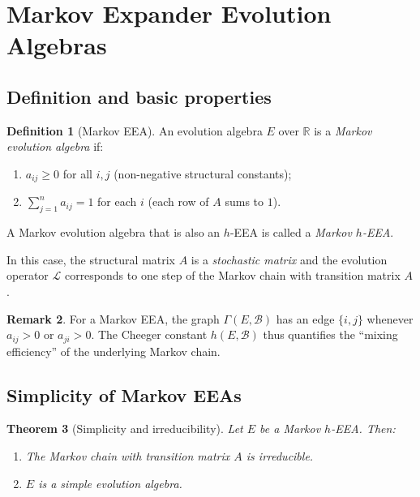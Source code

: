 \documentclass[12pt,a4paper]{amsart}
\newtheorem{theorem}{Theorem}[section]
\theoremstyle{definition}
\newtheorem{definition}[theorem]{Definition}
\newtheorem{remark}[theorem]{Remark}
\newcommand{\R}{\mathbb{R}}
\newcommand{\hh}{h}          %
\newcommand{\EA}{E}          %
\newcommand{\natbasis}{\mathcal{B}}  %
\newcommand{\strmat}{A}      %
\newcommand{\evop}{\mathcal{L}} %
\begin{document}
\section{Markov Expander Evolution Algebras}\label{sec:markov}

\subsection{Definition and basic properties}

\begin{definition}[Markov EEA]\label{def:markov-EEA}
An evolution algebra $\EA$ over $\R$ is a \emph{Markov evolution
algebra} if:
\begin{enumerate}[label=\normalfont(\roman*)]
  \item $a_{ij}\ge 0$ for all $i,j$ (non-negative structural constants);
  \item $\sum_{j=1}^n a_{ij}=1$ for each $i$ (each row of $\strmat$ sums
        to $1$).
\end{enumerate}
A Markov evolution algebra that is also an $h$-EEA is called a
\emph{Markov $h$-EEA}.
\end{definition}

In this case, the structural matrix $\strmat$ is a \emph{stochastic
matrix} and the evolution operator $\evop$ corresponds to one step of
the Markov chain with transition matrix $\strmat$.

\begin{remark}
For a Markov EEA, the graph $\varGamma(\EA,\natbasis)$ has an edge
$\{i,j\}$ whenever $a_{ij}>0$ or $a_{ji}>0$.  The Cheeger constant
$\hh(\EA,\natbasis)$ thus quantifies the ``mixing efficiency'' of the
underlying Markov chain.
\end{remark}

\subsection{Simplicity of Markov EEAs}\label{sub:markov-simple}

\begin{theorem}[Simplicity and irreducibility]\label{thm:markov-simple}
Let $\EA$ be a Markov $h$-EEA.  Then:
\begin{enumerate}[label=\normalfont(\roman*)]
  \item The Markov chain with transition matrix $\strmat$ is
        \emph{irreducible}.
  \item $\EA$ is a simple evolution algebra.
\end{enumerate}
\end{theorem}
\end{document}
